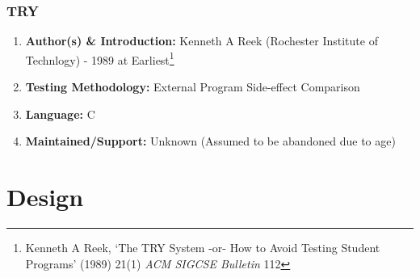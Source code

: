 \documentclass[xcolor]{beamer}
\begin{document}
\begin{frame}
	\frametitle{TRY}
	\begin{enumerate}
		\setlength\itemsep{1em}
		\item \textbf{Author(s) \& Introduction:} Kenneth A Reek (Rochester Institute of Technlogy) - 1989 at Earliest\footnote{Kenneth A Reek, ‘The TRY System -or- How to Avoid Testing Student Programs’ (1989) 21(1) \textit{ACM SIGCSE Bulletin} 112}
			\pause
		\item \textbf{Testing Methodology:} External Program Side-effect Comparison
			\pause
		\item \textbf{Language:} C
			\pause
		\item \textbf{Maintained/Support:} Unknown (Assumed to be abandoned due to age)
	\end{enumerate}
\end{frame}

\section{Design}
\end{document}
